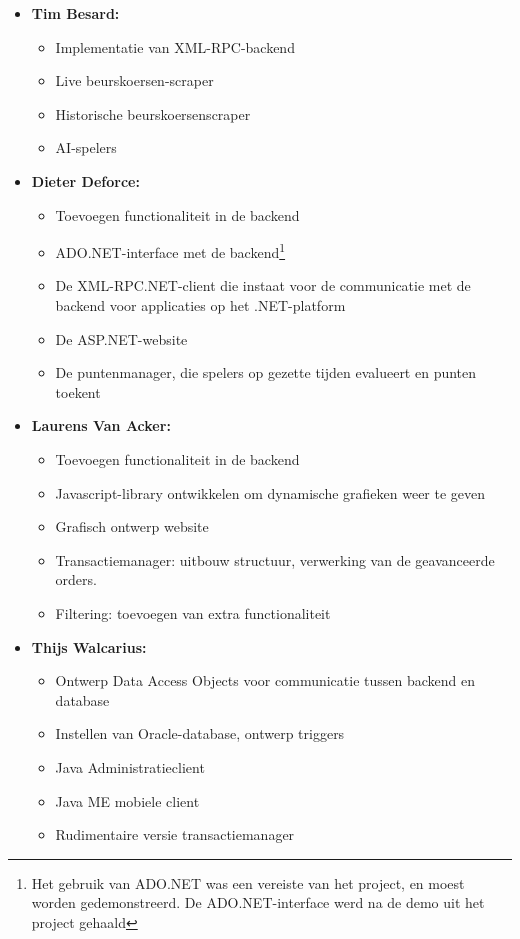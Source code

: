 \begin{itemize}
	\item \textbf{Tim Besard: }
	\begin{itemize}
		\item Implementatie van XML-RPC-backend
		\item Live beurskoersen-scraper
		\item Historische beurskoersenscraper
		\item AI-spelers
	\end{itemize}
	
	\item \textbf{Dieter Deforce: } 
		\begin{itemize}
			\item Toevoegen functionaliteit in de backend
			\item ADO.NET-interface met de backend\footnote{Het gebruik van ADO.NET was een vereiste van het project, en moest worden gedemonstreerd. De ADO.NET-interface werd na de demo uit het project gehaald}
			\item De XML-RPC.NET-client die instaat voor de communicatie met de backend voor applicaties op het .NET-platform
			\item De ASP.NET-website
			\item De puntenmanager, die spelers op gezette tijden evalueert en punten toekent
		\end {itemize}
		
	\item \textbf{Laurens Van Acker: }
	 \begin{itemize}
	 	\item Toevoegen functionaliteit in de backend
	  \item Javascript-library ontwikkelen om dynamische grafieken weer te geven
	  \item Grafisch ontwerp website
	 	\item Transactiemanager: uitbouw structuur, verwerking van de geavanceerde orders.
	 	\item Filtering: toevoegen van extra functionaliteit
	 \end{itemize}
	 
	 \item \textbf{Thijs Walcarius: }
	 \begin{itemize}
	 	\item Ontwerp Data Access Objects voor communicatie tussen backend en database
	 	\item Instellen van Oracle-database, ontwerp triggers
	 	\item Java Administratieclient
	 	\item Java ME mobiele client
	 	\item Rudimentaire versie transactiemanager
	 \end{itemize}
\end{itemize}


